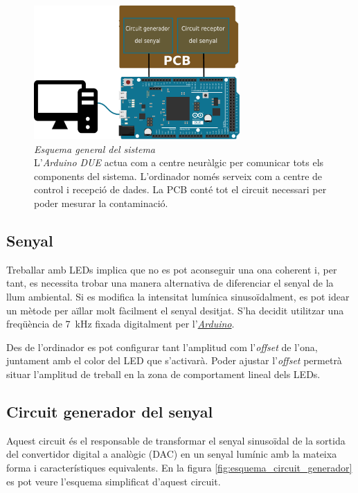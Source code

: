 \begin{figure}[htp]
	\centering
	\includegraphics[width=0.7\textwidth]{Figures/esquema_sistema.pdf}
	\caption[Esquema general del sistema]{\textit{Esquema general del sistema}\\{\footnotesize L'\textit{Arduino DUE} actua com a centre neuràlgic per comunicar tots els components del sistema. L'ordinador només serveix com a centre de control i recepció de dades. La \ac{PCB} conté tot el circuit necessari per poder mesurar la contaminació.}}
	\label{fig:esquema_sistema}
\end{figure}

\subsection{Senyal}

Treballar amb \acp{LED} implica que no es pot aconseguir una ona coherent i, per tant, es necessita trobar una manera alternativa de diferenciar el senyal de la llum ambiental. Si es modifica la intensitat lumínica sinusoïdalment, es pot idear un mètode per aïllar molt fàcilment el senyal desitjat. S'ha decidit utilitzar una freqüència de \SI{7}{\kilo\hertz} fixada digitalment per l'\hyperref[subsec:arduino]{\textit{Arduino}}.

Des de l'ordinador es pot configurar tant l'amplitud com l'\textit{offset} de l'ona, juntament amb el color del \ac{LED} que s'activarà. Poder ajustar l'\textit{offset} permetrà situar l'amplitud de treball en la zona de comportament lineal dels \acp{LED}.

\subsection{Circuit generador del senyal}\label{subsec:circuit_generador}

Aquest circuit és el responsable de transformar el senyal sinusoïdal de la sortida del convertidor digital a analògic (\ac{DAC}) en un senyal lumínic amb la mateixa forma i característiques equivalents. En la figura \ref{fig:esquema_circuit_generador} es pot veure l'esquema simplificat d'aquest circuit.

